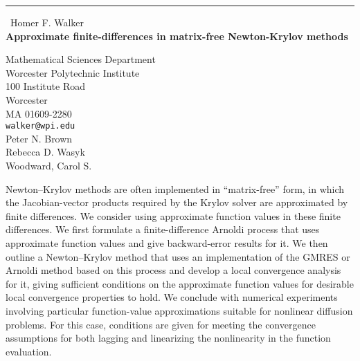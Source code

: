 \documentclass{report}
\begin{document}
\begin{center}
\rule{6in}{1pt} \
{\large Homer F. Walker \\
{\bf Approximate finite-differences in matrix-free Newton-Krylov methods}}

Mathematical Sciences Department \\ Worcester Polytechnic Institute \\ 100 Institute Road \\ Worcester \\ MA 01609-2280
\\
{\tt walker@wpi.edu}\\
Peter N.  Brown\\
Rebecca D.  Wasyk\\
	Woodward, Carol S. \end{center}

Newton--Krylov methods are often implemented in ``matrix-free'' form, in
which the Jacobian-vector products required by the Krylov solver are
approximated by finite differences. We consider using approximate
function values in these finite differences. We first formulate a
finite-difference Arnoldi process that uses approximate function values
and give backward-error results for it. We then outline a Newton--Krylov
method that uses an implementation of the GMRES or Arnoldi method based
on this process and develop a local convergence analysis for it, giving
sufficient conditions on the approximate function values for desirable
local convergence properties to hold. We conclude with numerical
experiments involving particular function-value approximations suitable
for nonlinear diffusion problems. For this case, conditions are given for
meeting the convergence assumptions for both lagging and linearizing the
nonlinearity in the function evaluation.
\end{document}
